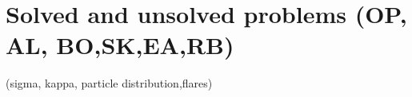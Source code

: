 \section{Solved and unsolved problems      (OP, AL, BO,SK,EA,RB)}
(sigma, kappa, particle distribution,flares)